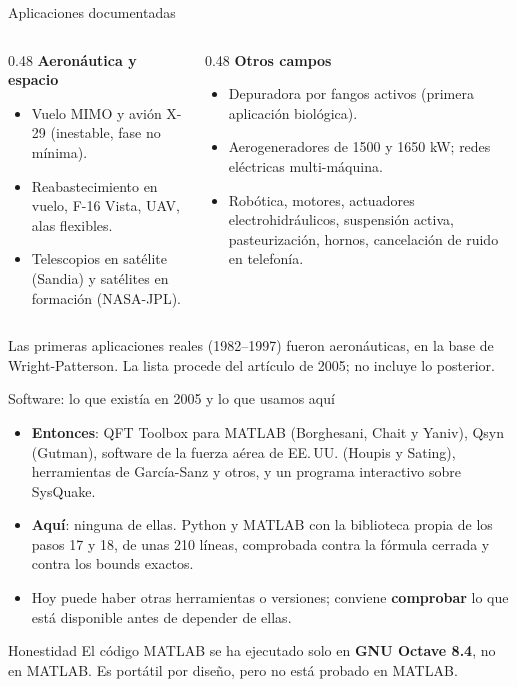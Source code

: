 \documentclass[aspectratio=169,11pt]{beamer}
\begin{document}
\begin{frame}{Aplicaciones documentadas}
  \small
  \begin{columns}[T]
  \begin{column}{0.48\textwidth}
    \textbf{Aeronáutica y espacio}
    \begin{itemize}
      \item Vuelo MIMO y avión X-29 (inestable, fase no mínima).
      \item Reabastecimiento en vuelo, F-16 Vista, UAV, alas flexibles.
      \item Telescopios en satélite (Sandia) y satélites en formación (NASA-JPL).
    \end{itemize}
  \end{column}
  \begin{column}{0.48\textwidth}
    \textbf{Otros campos}
    \begin{itemize}
      \item Depuradora por fangos activos (primera aplicación biológica).
      \item Aerogeneradores de 1500 y 1650 kW; redes eléctricas multi-máquina.
      \item Robótica, motores, actuadores electrohidráulicos, suspensión activa, pasteurización, hornos, cancelación de ruido en telefonía.
    \end{itemize}
  \end{column}
  \end{columns}
  \vspace{4pt}
  \footnotesize Las primeras aplicaciones reales (1982--1997) fueron aeronáuticas, en la base de Wright-Patterson. La lista procede del artículo de 2005; no incluye lo posterior.
\end{frame}

\begin{frame}{Software: lo que existía en 2005 y lo que usamos aquí}
  \small
  \begin{itemize}
    \item \textbf{Entonces}: QFT Toolbox para MATLAB (Borghesani, Chait y Yaniv), Qsyn (Gutman), software de la fuerza aérea de EE.\,UU. (Houpis y Sating), herramientas de García-Sanz y otros, y un programa interactivo sobre SysQuake.
    \item \textbf{Aquí}: ninguna de ellas. Python y MATLAB con la biblioteca propia de los pasos 17 y 18, de unas 210 líneas, comprobada contra la fórmula cerrada y contra los bounds exactos.
    \item Hoy puede haber otras herramientas o versiones; conviene \textbf{comprobar} lo que está disponible antes de depender de ellas.
  \end{itemize}
  \begin{alertblock}{Honestidad}
    El código MATLAB se ha ejecutado solo en \textbf{GNU Octave 8.4}, no en MATLAB. Es portátil por diseño, pero no está probado en MATLAB.
  \end{alertblock}
\end{frame}
\end{document}
